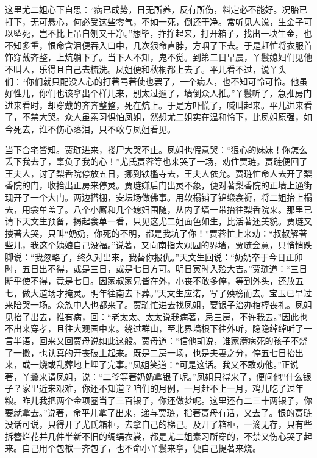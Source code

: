 \begin{parag}
    这里尤二姐心下自思：“病已成势，日无所养，反有所伤，料定必不能好。况胎已打下，无可悬心，何必受这些零气，不如一死，倒还干净。常听见人说，生金子可以坠死，岂不比上吊自刎又干净。”想毕，拃挣起来，打开箱子，找出一块生金，也不知多重，恨命含泪便吞入口中，几次狠命直脖，方咽了下去。于是赶忙将衣服首饰穿戴齐整，上炕躺下了。当下人不知，鬼不觉。到第二日早晨，丫鬟媳妇们见他不叫人，乐得且自己去梳洗。凤姐便和秋桐都上去了。平儿看不过，说丫头们：“你们就只配没人心的打著骂著使也罢了，一个病人，也不知可怜可怜。他虽好性儿，你们也该拿出个样儿来，别太过逾了，墙倒众人推。”丫鬟听了，急推房门进来看时，却穿戴的齐齐整整，死在炕上。于是方吓慌了，喊叫起来。平儿进来看了，不禁大哭。众人虽素习惧怕凤姐，然想尤二姐实在温和怜下，比凤姐原强，如今死去，谁不伤心落泪，只不敢与凤姐看见。
\end{parag}


\begin{parag}
    当下合宅皆知。贾琏进来，搂尸大哭不止。凤姐也假意哭：“狠心的妹妹！你怎么丢下我去了，辜负了我的心！”尤氏贾蓉等也来哭了一场，劝住贾琏。贾琏便回了王夫人，讨了梨香院停放五日，挪到铁槛寺去，王夫人依允。贾琏忙命人去开了梨香院的门，收拾出正房来停灵。贾琏嫌后门出灵不象，便对著梨香院的正墙上通街现开了一个大门。两边搭棚，安坛场做佛事。用软榻铺了锦缎衾褥，将二姐抬上榻去，用衾单盖了。八个小厮和几个媳妇围随，从内子墙一带抬往梨香院来。那里已请下天文生预备，揭起衾单一看，只见这尤二姐面色如生，比活著还美貌。贾琏又搂著大哭，只叫“奶奶，你死的不明，都是我坑了你！”贾蓉忙上来劝：“叔叔解著些儿，我这个姨娘自己没福。”说著，又向南指大观园的界墙，贾琏会意，只悄悄跌脚说：“我忽略了，终久对出来，我替你报仇。”天文生回说：“奶奶卒于今日正卯时，五日出不得，或是三日，或是七日方可。明日寅时入殓大吉。”贾琏道：“三日断乎使不得，竟是七日。因家叔家兄皆在外，小丧不敢多停，等到外头，还放五七，做大道场才掩灵。明年往南去下葬。”天文生应诺，写了殃榜而去。宝玉已早过来陪哭一场。众族中人也都来了。贾琏忙进去找凤姐，要银子治办棺椁丧礼。凤姐见抬了出去，推有病，回：“老太太、太太说我病著，忌三房，不许我去。”因此也不出来穿孝，且往大观园中来。绕过群山，至北界墙根下往外听，隐隐绰绰听了一言半语，回来又回贾母说如此这般。贾母道：“信他胡说，谁家痨病死的孩子不烧了一撒，也认真的开丧破土起来。既是二房一场，也是夫妻之分，停五七日抬出来，或一烧或乱葬地上埋了完事。”凤姐笑道：“可是这话。我又不敢劝他。”正说著，丫鬟来请凤姐，说：“二爷等著奶奶拿银子呢。”凤姐只得来了，便问他“什么银子？家里近来艰难，你还不知道？咱们的月例，一月赶不上一月，鸡儿吃了过年粮。昨儿我把两个金项圈当了三百银子，你还做梦呢。这里还有二三十两银子，你要就拿去。”说著，命平儿拿了出来，递与贾琏，指著贾母有话，又去了。恨的贾琏没话可说，只得开了尤氏箱柜，去拿自己的梯己。及开了箱柜，一滴无存，只有些拆簪烂花并几件半新不旧的绸绢衣裳，都是尤二姐素习所穿的，不禁又伤心哭了起来。自己用个包袱一齐包了，也不命小丫鬟来拿，便自己提著来烧。
\end{parag}



